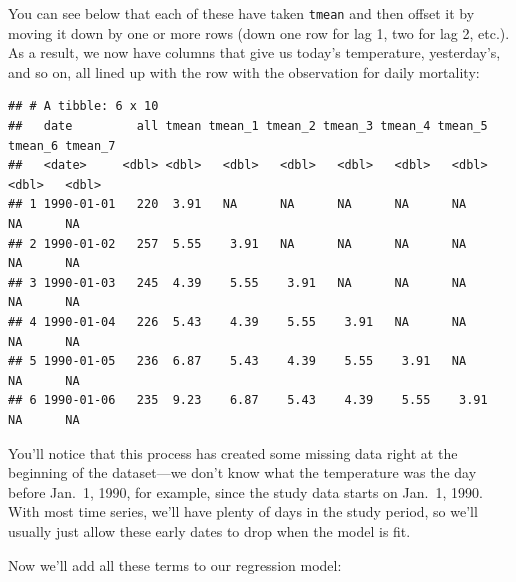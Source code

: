 \documentclass[
]{book}
\newenvironment{Shaded}{\begin{snugshade}}{\end{snugshade}}
\newcommand{\DecValTok}[1]{\textcolor[rgb]{0.00,0.00,0.81}{#1}}
\newcommand{\KeywordTok}[1]{\textcolor[rgb]{0.13,0.29,0.53}{\textbf{#1}}}
\newcommand{\NormalTok}[1]{#1}
\newcommand{\OperatorTok}[1]{\textcolor[rgb]{0.81,0.36,0.00}{\textbf{#1}}}
\newcommand{\StringTok}[1]{\textcolor[rgb]{0.31,0.60,0.02}{#1}}
\begin{document}
You can see below that each of these have taken \texttt{tmean} and then offset it by moving it down
by one or more rows (down one row for lag 1, two for lag 2, etc.). As a result, we now have
columns that give us today's temperature, yesterday's, and so on, all lined up with the
row with the observation for daily mortality:

\begin{Shaded}
\end{Shaded}

\begin{verbatim}
## # A tibble: 6 x 10
##   date         all tmean tmean_1 tmean_2 tmean_3 tmean_4 tmean_5 tmean_6 tmean_7
##   <date>     <dbl> <dbl>   <dbl>   <dbl>   <dbl>   <dbl>   <dbl>   <dbl>   <dbl>
## 1 1990-01-01   220  3.91   NA      NA      NA      NA      NA         NA      NA
## 2 1990-01-02   257  5.55    3.91   NA      NA      NA      NA         NA      NA
## 3 1990-01-03   245  4.39    5.55    3.91   NA      NA      NA         NA      NA
## 4 1990-01-04   226  5.43    4.39    5.55    3.91   NA      NA         NA      NA
## 5 1990-01-05   236  6.87    5.43    4.39    5.55    3.91   NA         NA      NA
## 6 1990-01-06   235  9.23    6.87    5.43    4.39    5.55    3.91      NA      NA
\end{verbatim}

You'll notice that this process has created some missing data right at the beginning of the
dataset---we don't know what the temperature was the day before Jan.~1, 1990, for example,
since the study data starts on Jan.~1, 1990. With most time series, we'll have plenty of
days in the study period, so we'll usually just allow these early dates to drop when the
model is fit.

Now we'll add all these terms to our regression model:
\end{document}
